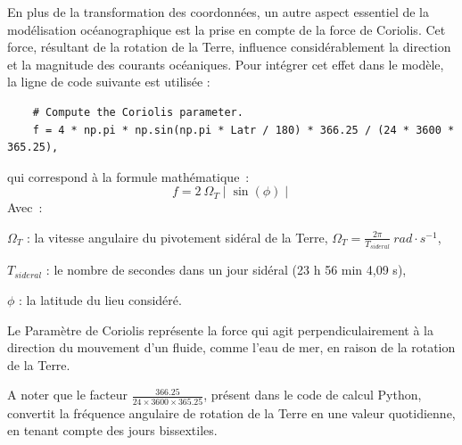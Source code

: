 {%

En plus de la transformation des coordonnées, un autre aspect essentiel de la modélisation océanographique est la prise en compte de la force de Coriolis. Cet force, résultant de la rotation de la Terre, influence considérablement la direction et la magnitude des courants océaniques. Pour intégrer cet effet dans le modèle, la ligne de code suivante est utilisée :

\begin{verbatim}
	# Compute the Coriolis parameter.
	f = 4 * np.pi * np.sin(np.pi * Latr / 180) * 366.25 / (24 * 3600 * 365.25),
\end{verbatim}

qui correspond à la formule mathématique~:
\begin{equation}\label{eq:coriolis}
    f=2\ \Omega_{T} \mid \sin(\phi ) \mid
\end{equation}
Avec~:
\begin{list}{}{}
    \item $\Omega_{T}$ : la vitesse angulaire du pivotement sidéral de la Terre, \(  \Omega_{T} ={\frac {2\pi }{T_{sideral}}}\ rad\cdot s^{-1} \),
    \item $T_{sideral}$ : le nombre de secondes dans un jour sidéral (23 h 56 min 4,09 s),
    \item $\phi$ : la latitude du lieu considéré.
\end{list}

Le Paramètre de Coriolis représente la force qui agit perpendiculairement à la direction du mouvement d'un fluide, comme l'eau de mer, en raison de la rotation de la Terre.

A noter que le facteur \( \frac{366.25}{24 \times 3600 \times 365.25} \), présent dans le code de calcul Python, convertit la fréquence angulaire de rotation de la Terre en une valeur quotidienne, en tenant compte des jours bissextiles.


}
